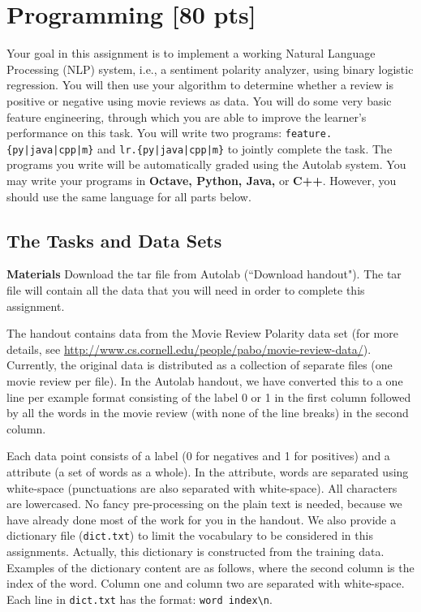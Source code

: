 \section{Programming [80 pts]}
\label{programming}

Your goal in this assignment is to implement a working Natural Language Processing (NLP) system, i.e., a sentiment polarity analyzer, using binary logistic regression. You will then use your algorithm to determine whether a review is positive or negative using movie reviews as data. You will do some very basic feature engineering, through which you are able to improve the learner's performance on this task. You will write two programs: \texttt{feature.\{py|java|cpp|m\}} and \texttt{lr.\{py|java|cpp|m\}} to jointly complete the task. The programs you write will be automatically graded using the Autolab system. You may write your programs in {\bf Octave, Python, Java,} or {\bf C++}. However, you should use the same language for all parts below.


\subsection{The Tasks and Data Sets}\label{dataset}


  {\bf Materials } Download the tar file from Autolab (``Download handout"). The tar file will contain all the data that you will need in order to complete this assignment.
  
 The handout contains data from the Movie Review Polarity data set (for more details, see \url{http://www.cs.cornell.edu/people/pabo/movie-review-data/}).  Currently, the original data is distributed as a collection of separate files (one movie review per file). In the Autolab handout, we have converted this to a one line per example format consisting of the label 0 or 1 in the first column followed by all the words in the movie review (with none of the line breaks) in the second column.
 
 
 
 Each data point consists of a label (0 for negatives and 1 for positives) and a attribute (a set of words as a whole). In the attribute, words are separated using white-space (punctuations are also separated with white-space). All characters are lowercased. No fancy pre-processing on the plain text is needed, because we have already done most of the work for you in the handout. We also provide a dictionary file (\lstinline{dict.txt}) to limit the vocabulary to be considered in this assignments. Actually, this dictionary is constructed from the training data. Examples of the dictionary content are as follows, where the second column is the index of the word. Column one and column two are separated with white-space. Each line in \lstinline{dict.txt}  has the format: \lstinline{word index\n}.
 
